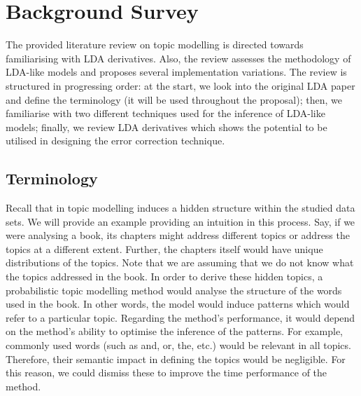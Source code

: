 \documentclass{mprop}
\begin{document}
\section{Background Survey}

\par The provided literature review on topic modelling is directed towards familiarising with LDA derivatives. Also, the review assesses the methodology of LDA-like models and proposes several implementation variations. The review is structured in progressing order: at the start, we look into the original LDA paper and define the terminology (it will be used throughout the proposal); then, we familiarise with two different techniques used for the inference of LDA-like models; finally, we review LDA derivatives which shows the potential to be utilised in designing the error correction technique.

\subsection{Terminology}

\par Recall that in topic modelling induces a hidden structure within the studied data sets. We will provide an example providing an intuition in this process. Say, if we were analysing a book, its chapters might address different topics or address the topics at a different extent. Further, the chapters itself would have unique distributions of the topics. Note that we are assuming that we do not know what the topics addressed in the book. In order to derive these hidden topics, a probabilistic topic modelling method would analyse the structure of the words used in the book. In other words, the model would induce patterns which would refer to a particular topic. Regarding the method's performance, it would depend on the method's ability to optimise the inference of the patterns. For example, commonly used words (such as and, or, the, etc.) would be relevant in all topics. Therefore, their semantic impact in defining the topics would be negligible. For this reason, we could dismiss these to improve the time performance of the method. 
\end{document}
